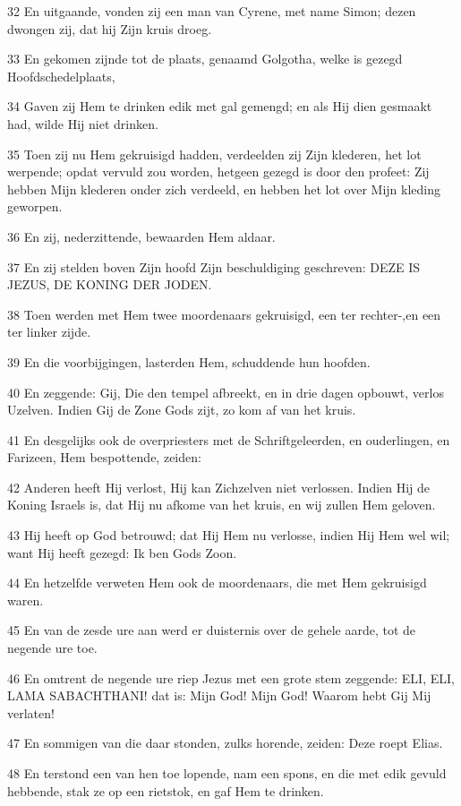 \par 32 En uitgaande, vonden zij een man van Cyrene, met name Simon; dezen dwongen zij, dat hij Zijn kruis droeg.
\par 33 En gekomen zijnde tot de plaats, genaamd Golgotha, welke is gezegd Hoofdschedelplaats,
\par 34 Gaven zij Hem te drinken edik met gal gemengd; en als Hij dien gesmaakt had, wilde Hij niet drinken.
\par 35 Toen zij nu Hem gekruisigd hadden, verdeelden zij Zijn klederen, het lot werpende; opdat vervuld zou worden, hetgeen gezegd is door den profeet: Zij hebben Mijn klederen onder zich verdeeld, en hebben het lot over Mijn kleding geworpen.
\par 36 En zij, nederzittende, bewaarden Hem aldaar.
\par 37 En zij stelden boven Zijn hoofd Zijn beschuldiging geschreven: DEZE IS JEZUS, DE KONING DER JODEN.
\par 38 Toen werden met Hem twee moordenaars gekruisigd, een ter rechter-,en een ter linker zijde.
\par 39 En die voorbijgingen, lasterden Hem, schuddende hun hoofden.
\par 40 En zeggende: Gij, Die den tempel afbreekt, en in drie dagen opbouwt, verlos Uzelven. Indien Gij de Zone Gods zijt, zo kom af van het kruis.
\par 41 En desgelijks ook de overpriesters met de Schriftgeleerden, en ouderlingen, en Farizeen, Hem bespottende, zeiden:
\par 42 Anderen heeft Hij verlost, Hij kan Zichzelven niet verlossen. Indien Hij de Koning Israels is, dat Hij nu afkome van het kruis, en wij zullen Hem geloven.
\par 43 Hij heeft op God betrouwd; dat Hij Hem nu verlosse, indien Hij Hem wel wil; want Hij heeft gezegd: Ik ben Gods Zoon.
\par 44 En hetzelfde verweten Hem ook de moordenaars, die met Hem gekruisigd waren.
\par 45 En van de zesde ure aan werd er duisternis over de gehele aarde, tot de negende ure toe.
\par 46 En omtrent de negende ure riep Jezus met een grote stem zeggende: ELI, ELI, LAMA SABACHTHANI! dat is: Mijn God! Mijn God! Waarom hebt Gij Mij verlaten!
\par 47 En sommigen van die daar stonden, zulks horende, zeiden: Deze roept Elias.
\par 48 En terstond een van hen toe lopende, nam een spons, en die met edik gevuld hebbende, stak ze op een rietstok, en gaf Hem te drinken.
